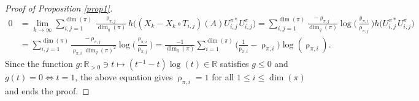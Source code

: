 \documentclass{amsart}
\newcommand{\RR}{\mathbb{R}}
\theoremstyle{definition}
\numberwithin{equation}{section}
\begin{document}
\begin{proof}[Proof of Proposition \ref{prop1}]
\[\begin{split}
0&=\lim_{k\to\infty}
\sum_{i,j=1}^{\dim(\pi)} \tfrac{\uprho_{\pi,j}}{\dim_q(\pi)} h\bigl( (X_k-X_k\circ T_{i,j})(A) U^{\pi *}_{i,j} U^{\pi}_{i,j}\bigr)=
\sum_{i,j=1}^{\dim(\pi)} \tfrac{-\uprho_{\pi,j}}{\dim_q(\pi)} \log\bigl(\tfrac{\uprho_{\pi,i}}{\uprho_{\pi,j}}\bigr)
h\bigl( U^{\pi *}_{i,j} U^{\pi}_{i,j}\bigr)\\
&=
\sum_{i,j=1}^{\dim(\pi)} \tfrac{-\uprho_{\pi,j}}{\uprho_{\pi,i}\dim_q(\pi)^2} \log\bigl(\tfrac{\uprho_{\pi,i}}{\uprho_{\pi,j}}\bigr)=
\tfrac{-1}{\dim_q(\pi)}\sum_{i=1}^{\dim(\pi)}\bigl( \tfrac{1}{\uprho_{\pi,i}}-\uprho_{\pi,i}\bigr)\log(\uprho_{\pi,i}).
\end{split}\]
Since the function $g\colon \RR_{>0}\ni t\mapsto (t^{-1}-t)\log(t)\in \RR$ satisfies $g\le 0$ and $g(t)=0\Leftrightarrow t=1$, the above equation gives $\uprho_{\pi,i}=1$ for all $1\le i\le \dim(\pi)$ and ends the proof.
\end{proof}



\end{document}
